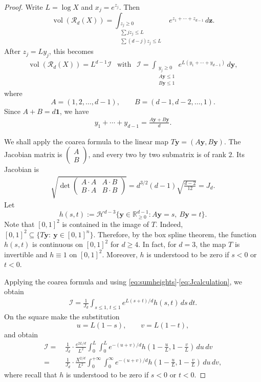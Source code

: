 \documentclass[12pt,a4paper,reqno]{amsart}
\numberwithin{equation}{section}
\newcommand{\R}{\mathbb R}
\newcommand{\cH}{\mathcal H}
\newcommand{\cR}{\mathcal R}
\newcommand{\1}{\mathbf 1}
\newcommand{\bsy}{\boldsymbol y}
\newcommand{\bsz}{\boldsymbol z}
\DeclareMathOperator{\vol}{vol}
\theoremstyle{plain}
\theoremstyle{definition}
\begin{document}
\begin{proof}
Write $L=\log X$ and $x_j=e^{z_j}$.  Then
\[
 \vol(\cR_d(X))
 =\int_{\substack{z_j\geq0\\
 \sum jz_j\leq L\\
 \sum(d-j)z_j\leq L}}
 e^{z_1+\cdots+z_{d-1}}\,d\bsz.
\]
After $z_j=Ly_j$, this becomes
\begin{align}\vol(\cR_d(X))=
 L^{d-1}\mathcal{I} \ \ \textrm{ with }\ \ \mathcal{I}=
 \int_{\substack{y_j\geq0\\A\bsy\leq1\\B\bsy\leq1}}
 e^{L(y_1+\cdots+y_{d-1})}\,d\bsy,
\label{eq:logintegral}
\end{align}
where
\[
 A=(1,2,\ldots,d-1),
 \qquad B=(d-1,d-2,\ldots,1).
\]
Since $A+B=d\1$, we have
\begin{align}
 y_1+\cdots+y_{d-1}=\frac{A\bsy+B\bsy}{d}.
\label{eq:sumheights}
\end{align}

We shall apply the coarea formula to the linear map
$T\bsy=(A\bsy,B\bsy)$.  The Jacobian matrix is
$\begin{pmatrix}
A \\ B
 \end{pmatrix}$, and every two by two submatrix is of rank $2$. Its Jacobian is
\begin{align}
 \sqrt{\det
 \begin{pmatrix}
 A\cdot A&A\cdot B\\B\cdot A&B\cdot B
 \end{pmatrix}}
 =d^{3/2}(d-1)\sqrt{\frac{d-2}{12}}=J_d.
\label{eq:Jcalculation}
\end{align}
Let
\[
 h(s,t):=\cH^{d-3}
 \{\bsy\in\R_{\geq0}^{d-1}:A\bsy=s,\ B\bsy=t\}.
\]
Note that $[0,1]^2$ is contained in the image of $T$. Indeed, $[0,1]^2\subseteq \{T\mathbf{y}:\ \mathbf{y}\in [0,1]^n\}$. Therefore, by the box spline theorem, the function $h(s,t)$ is continuous on $[0,1]^2$ for $d\geq 4$. In fact, for $d=3$, the map $T$ is invertible and $h\equiv1$ on $[0,1]^2$. Moreover, $h$ is understood to be zero if $s<0$ or $t<0$.


 Applying the coarea formula and using
\eqref{eq:sumheights}-\eqref{eq:Jcalculation}, we obtain
\begin{align*}\mathcal{I}=
 \frac1{J_d}\int_{s\leq1,\,t\leq1}
 e^{L(s+t)/d}h(s,t)\,ds\,dt.
\end{align*}
 On
the square make the substitution
\[
 u=L(1-s),\qquad v=L(1-t),
\]
and obtain 
\begin{align*}
 \mathcal{I}=&\,  \frac1{J_d}\cdot\frac{e^{2L/d}}{L^2}
 \int_0^{ L}\!\int_0^{ L}
 e^{-(u+v)/d}
 h\left(1-\frac{u}{L},1-\frac{v}{L}\right)\,du\,dv
 \\ =&\,\frac1{J_d}\cdot \frac{X^{2/d}}{L^2}
 \int_0^{ +\infty}\!\int_0^{ \infty}
 e^{-(u+v)/d}
 h\left(1-\frac{u}{L},1-\frac{v}{L}\right)\,du\,dv,
\end{align*}
where recall that $h$ is understood to be zero if $s<0$ or $t<0$. 


\end{proof}
\end{document}
